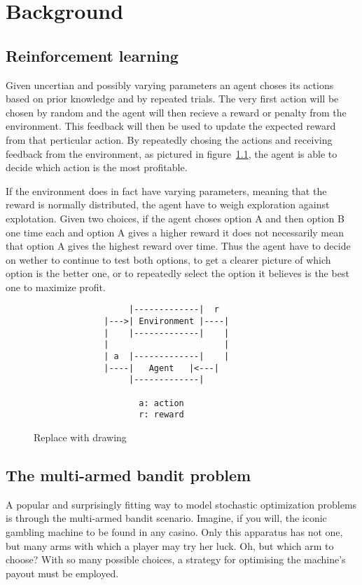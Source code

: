 \chapter{Background}
\label{ch:background}

\section{Reinforcement learning}
Given uncertian and possibly varying parameters an agent choses
its actions based on prior knowledge and by repeated trials. The very first action
will be chosen by random and the agent will then recieve a reward or
penalty from the environment. This feedback will then be used to update the expected reward
from that perticular action. By repeatedly chosing the actions and receiving feedback
from the environment, as pictured in figure~\ref{fig:la}, the agent is able to
decide which action is the most profitable. 

If the environment does in fact have varying parameters, meaning that the reward
is normally distributed, the agent have to weigh exploration against
explotation. Given two choices, if the agent choses option A and then option B one time each and
option A gives a higher reward it does not necessarily mean that option A gives the highest
reward over time. Thus the agent have to decide on wether to continue
to test both options, to get a clearer picture of which option is the better one, or to repeatedly
select the option it believes is the best one to maximize profit. 

\begin{figure}[ht]
        \begin{verbatim}
                   |-------------|  r
              |--->| Environment |----|
              |    |-------------|    |
              |                       | 
              | a  |-------------|    |
              |----|   Agent   |<---|
                   |-------------|
         
                     a: action
                     r: reward
        \end{verbatim}
        \label{fig:la}
    \caption{Replace with drawing}
\end{figure}

\section{The multi-armed bandit problem}
A popular and surprisingly fitting way to model stochastic optimization problems 
is through the multi-armed bandit scenario. Imagine, if you will, the iconic 
gambling machine to be found in any casino. Only this apparatus has not one, but 
many arms with which a player may try her luck. Oh, but which arm to choose? 
With so many possible choices, a strategy for optimising the machine’s payout 
must be employed. 

